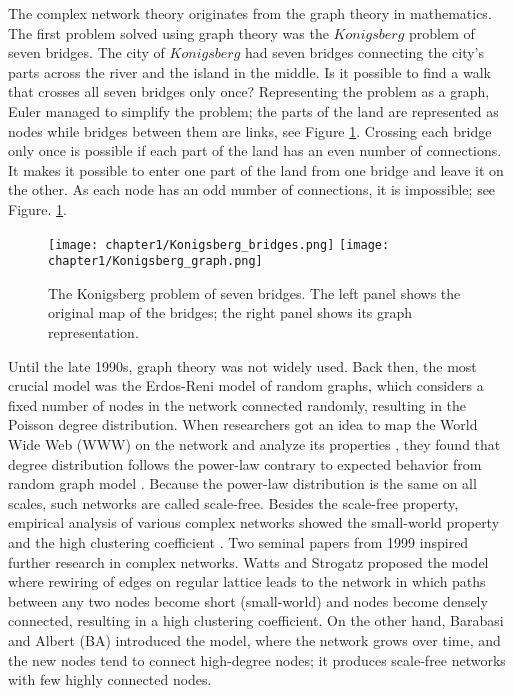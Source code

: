 The complex network theory originates from the graph theory in mathematics. The first problem solved using graph theory was the $Konigsberg$ problem of seven bridges. The city of $Konigsberg$ had seven bridges connecting the city's parts across the river and the island in the middle. Is it possible to find a walk that crosses all seven bridges only once? Representing the problem as a graph, Euler managed to simplify the problem; the parts of the land are represented as nodes while bridges between them are links, see Figure \ref{fig:Krgraph}. Crossing each bridge only once is possible if each part of the land has an even number of connections. It makes it possible to enter one part of the land from one bridge and leave it on the other. As each node has an odd number of connections, it is impossible; see Figure. \ref{fig:Krgraph}.

\begin{figure}[!ht]
	\centering
	\texttt{[image: chapter1/Konigsberg\_bridges.png]} \hspace{2cm}
	\texttt{[image: chapter1/Konigsberg\_graph.png]}
	\caption[Konigsberg problem of seven bridges.]{The Konigsberg problem of seven bridges. The left panel shows the original map of the bridges; the right panel shows its graph representation.}
	
	\label{fig:Krgraph}
\end{figure}

Until the late 1990s, graph theory was not widely used. Back then, the most crucial model was the Erdos-Reni model of random graphs, which considers a fixed number of nodes in the network connected randomly, resulting in the Poisson degree distribution. When researchers got an idea to map the World Wide Web (WWW) on the network and analyze its properties \cite{huberman1999}, they found that degree distribution follows the power-law contrary to expected behavior from random graph model \cite{dorogovtsev2010complex}. Because the power-law distribution is the same on all scales, such networks are called scale-free. Besides the scale-free property, empirical analysis of various complex networks showed the small-world property and the high clustering coefficient \cite{barabasi2009,newman2010}. Two seminal papers from 1999 inspired further research in complex networks. Watts and Strogatz \cite{watts1998collective} proposed the model where rewiring of edges on regular lattice leads to the network in which paths between any two nodes become short (small-world) and nodes become densely connected, resulting in a high clustering coefficient. On the other hand, Barabasi and Albert (BA) \cite{barabasi1999} introduced the model, where the network grows over time, and the new nodes tend to connect high-degree nodes; it produces scale-free networks with few highly connected nodes. 


